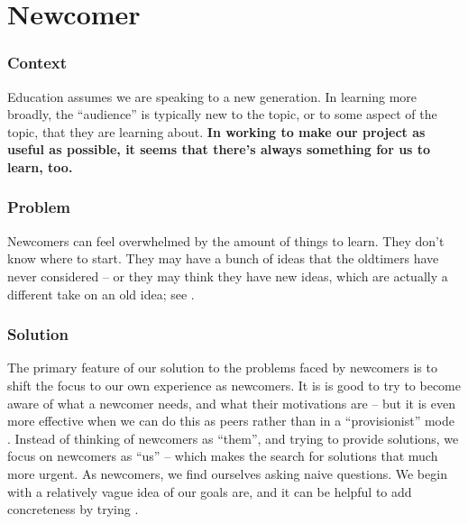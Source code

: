

\section{Newcomer}\label{sec:Newcomer}

\subsubsection*{Context}
Education assumes we are speaking to a new generation. 
In learning more broadly, the ``audience'' is typically new to the topic, or to some aspect of the topic, that they are learning about.
\textbf{In working to make our project as useful as possible, it seems that there's always something for us to learn, too.}

\subsubsection*{Problem} Newcomers can feel overwhelmed by the amount of things to learn.  They
don't know where to start.  They may have a bunch of ideas that the
oldtimers have never considered -- or they may think they have new
ideas, which are actually a different take on an old idea; see
.

\subsubsection*{Solution}
The primary feature of our solution to the problems faced by newcomers
is to shift the focus to our own experience as newcomers.
It is is good to try to become aware of what a newcomer needs, and what their
motivations are -- but it is even more effective when we can do this as peers rather than
in a ``provisionist'' mode \cite{boud2005peer}.  Instead of
thinking of newcomers as ``them'', and trying to provide solutions, we focus
on newcomers as ``us'' -- which makes the search for solutions that much more urgent. 
As newcomers, we find ourselves asking naive questions.
We begin with a relatively vague idea of our goals are, 
and it can be helpful to add concreteness by trying .

